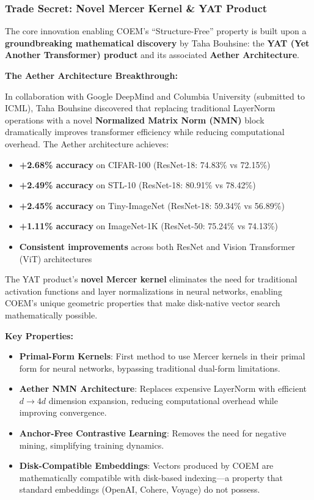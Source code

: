 \subsubsection{Trade Secret: Novel Mercer Kernel \& YAT Product}

The core innovation enabling COEM's ``Structure-Free'' property is built upon a \textbf{groundbreaking mathematical discovery} by Taha Bouhsine: the \textbf{YAT (Yet Another Transformer) product} and its associated \textbf{Aether Architecture}.

\textbf{The Aether Architecture Breakthrough:}

In collaboration with Google DeepMind and Columbia University (submitted to ICML), Taha Bouhsine discovered that replacing traditional LayerNorm operations with a novel \textbf{Normalized Matrix Norm (NMN)} block dramatically improves transformer efficiency while reducing computational overhead. The Aether architecture achieves:

\begin{itemize}[noitemsep]
    \item \textbf{+2.68\% accuracy} on CIFAR-100 (ResNet-18: 74.83\% vs 72.15\%)
    \item \textbf{+2.49\% accuracy} on STL-10 (ResNet-18: 80.91\% vs 78.42\%)
    \item \textbf{+2.45\% accuracy} on Tiny-ImageNet (ResNet-18: 59.34\% vs 56.89\%)
    \item \textbf{+1.11\% accuracy} on ImageNet-1K (ResNet-50: 75.24\% vs 74.13\%)
    \item \textbf{Consistent improvements} across both ResNet and Vision Transformer (ViT) architectures
\end{itemize}

The YAT product's \textbf{novel Mercer kernel} eliminates the need for traditional activation functions and layer normalizations in neural networks, enabling COEM's unique geometric properties that make disk-native vector search mathematically possible.


\textbf{Key Properties:}
\begin{itemize}
    \item \textbf{Primal-Form Kernels}: First method to use Mercer kernels in their primal form for neural networks, bypassing traditional dual-form limitations.
    \item \textbf{Aether NMN Architecture}: Replaces expensive LayerNorm with efficient $d \rightarrow 4d$ dimension expansion, reducing computational overhead while improving convergence.
    \item \textbf{Anchor-Free Contrastive Learning}: Removes the need for negative mining, simplifying training dynamics.
    \item \textbf{Disk-Compatible Embeddings}: Vectors produced by COEM are mathematically compatible with disk-based indexing—a property that standard embeddings (OpenAI, Cohere, Voyage) do not possess.
\end{itemize}

